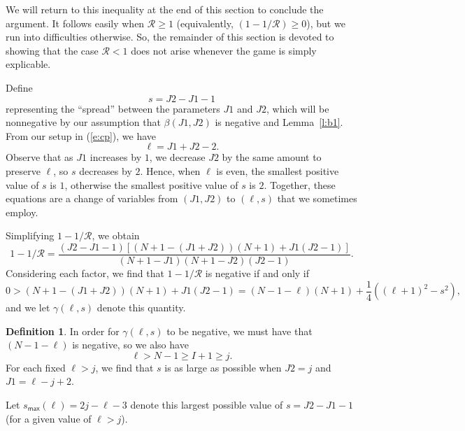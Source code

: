 \documentclass[11pt]{amsart}   %
\theoremstyle{definition}
\newtheorem{definition}[theorem]{Definition}
\theoremstyle{remark}
\numberwithin{equation}{section}
\theoremstyle{theorem}
\begin{document}
We will return to this inequality at the end of this section to conclude the argument.  It follows easily when $\mathcal{R} \geq 1$ (equivalently, $(1 - 1/\mathcal{R}) \geq 0$), but we run into difficulties otherwise.  So, the remainder of this section is devoted to showing that the case $\mathcal{R} < 1$ does not arise whenever the game is simply explicable.

Define
\[ s = J2 - J1 - 1 \]
representing the ``spread'' between the parameters $J1$ and $J2$, which will be nonnegative by our assumption that $\beta(J1,J2)$ is negative and Lemma~\ref{l:b1}.  From our setup in (\ref{e:cp}), we have
\[ \ell = J1 + J2 - 2. \]
Observe that as $J1$ increases by $1$, we decrease $J2$ by the same amount to preserve $\ell$, so $s$ decreases by $2$.  Hence, when $\ell$ is even, the smallest positive value of $s$ is $1$, otherwise the smallest positive value of $s$ is $2$.  Together, these equations are a change of variables from $(J1,J2)$ to $(\ell, s)$ that we sometimes employ.

Simplifying $1-1/\mathcal{R}$, we obtain
\[ 1-1/\mathcal{R} = \frac{ (J2-J1-1)\left[ (N+1-(J1+J2))(N+1) + J1(J2-1) \right]}{(N+1-J1)(N+1-J2)(J2-1)}. \]
Considering each factor, we find that $1-1/\mathcal{R}$ is negative if and only if 
\[ 0 > (N+1-(J1+J2))(N+1) + J1(J2-1) = (N-1-\ell)(N+1) + \frac{1}{4}\left( (\ell+1)^2 - s^2 \right), \]
and we let $\gamma(\ell, s)$ denote this quantity.

\begin{definition}
In order for $\gamma(\ell, s)$ to be negative, we must have that $(N-1-\ell)$
is negative, so we also have 
\[ \ell > N-1 \geq I+1 \geq j. \]
For each fixed $\ell > j$, we find that $s$ is as large as possible when $J2 =
j$ and $J1 = \ell - j + 2$.  

Let $s_{\mathsf{max}}(\ell) = 2j - \ell - 3$ denote this largest possible value
of $s = J2 - J1 - 1$ (for a given value of $\ell > j$).
\end{definition}
\end{document}
